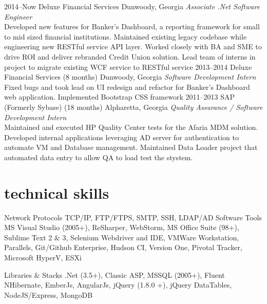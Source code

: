 \documentclass[]{friggeri-cv} %
\begin{document}
\begin{entrylist}
\entry
{2014--Now}
{Deluxe Financial Services}
{Dunwoody, Georgia}
{\emph{Associate .Net Software Engineer} \\
Developed new features for Banker's Dashboard, a reporting framework for small to mid sized financial institutions.
Maintained existing legacy codebase while engineering new RESTful service API layer.
Worked closely with BA and SME to drive ROI and deliver rebranded Credit Union solution.
Lead team of interns in project to migrate existing WCF service to RESTful service}
\entry
{2013--2014}
{Deluxe Financial Services (8 months)}
{Dunwoody, Georgia}
{\emph{Software Development Intern} \\
Fixed bugs and took lead on UI redesign and refactor for Banker's Dashboard web application.
Implemented Bootstrap CSS framework}
\entry
{2011--2013}
{SAP (Formerly Sybase) (18 months)}
{Alpharetta, Georgia}
{\emph{Quality Assurance / Software Development Intern} \\
Maintained and executed HP Quality Center tests for the Afaria MDM solution.
Developed internal applications leveraging AD server for authentication to automate VM and Database management.
Maintained Data Loader project that automated data entry to allow QA to load test the stystem. }
\end{entrylist}


\section{technical skills}

\begin{entrylist}
\entry
{}
{Network Protocols}
{}
{TCP/IP, FTP/FTPS, SMTP, SSH, LDAP/AD}
\entry
{}
{Software Tools}
{}
{MS Visual Studio (2005+), ReSharper, WebStorm, MS Office Suite (98+), Sublime Text 2 \& 3, Selenium Webdriver and IDE, VMWare Workstation, Parallels, Git/Github Enterprise, Hudson CI, Version One, Pivotal Tracker, Microsoft HyperV, ESXi}

\entry
{}
{Libraries \& Stacks}
{}
{.Net (3.5+), Classic ASP, MSSQL (2005+), Fluent NHibernate,
EmberJs, AngularJs, jQuery (1.8.0 +), jQuery DataTables, NodeJS/Express, MongoDB}
\end{entrylist}
\end{document}
